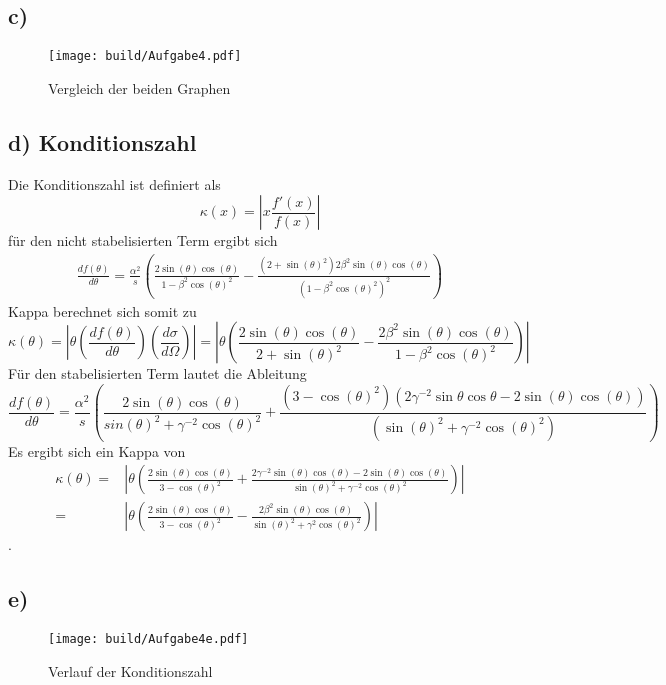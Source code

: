 \subsection*{c)}
\begin{figure}
  \centering
  \texttt{[image: build/Aufgabe4.pdf]}
  \caption{Vergleich der beiden Graphen}
  \label{fig:Vergleich der beiden Graphen}
\end{figure}
\subsection*{d) Konditionszahl}
Die Konditionszahl ist definiert als 
\begin{equation}
  \kappa(x) = \left| x\frac{f'(x)}{f(x)} \right|
  \label{}
\end{equation}
für den nicht stabelisierten Term ergibt sich 
\begin{eqnarray}
  \frac{df(\theta)}{d\theta} = \frac{\alpha^2}{s} \left( \frac{2\sin(\theta)\cos(\theta)}{1 - \beta^2 \cos(\theta)^2} - \frac{(2+\sin(\theta)^2)2\beta^2\sin(\theta)\cos(\theta)}{(1-\beta^2\cos(\theta)^2)^2} \right)
  \label{}
\end{eqnarray}
Kappa berechnet sich somit zu 
\begin{equation}
  \kappa(\theta) = \left| \theta \left( \frac{df(\theta)}{d\theta} \right) \left( \frac{d\sigma}{d\Omega} \right) \right| = \left| \theta \left( \frac{2\sin(\theta)\cos(\theta)}{2 + \sin(\theta)^2} - \frac{2\beta^2\sin(\theta)\cos(\theta)}{1 - \beta^2 \cos(\theta)^2} \right) \right|
  \label{}
\end{equation}
Für den stabelisierten Term lautet die Ableitung
\begin{equation}
  \frac{df(\theta)}{d\theta} = \frac{\alpha^2}{s}\left( \frac{2\sin(\theta)\cos(\theta)}{sin(\theta)^2+\gamma^{-2}\cos(\theta)^2} + \frac{(3-\cos(\theta)^2)(2\gamma^{-2}\sin{\theta}\cos{\theta}-2\sin(\theta)\cos(\theta))}{(\sin(\theta)^2 + \gamma^{-2}\cos(\theta)^2)} \right)
  \label{<++>}
\end{equation}
Es ergibt sich ein Kappa von 
\begin{eqnarray}
  \kappa(\theta) =& \left| \theta \left( \frac{2\sin(\theta)\cos(\theta)}{3 - \cos(\theta)^2} + \frac{2\gamma^{-2}\sin(\theta)\cos(\theta) - 2\sin(\theta)\cos(\theta)}{\sin(\theta)^2 + \gamma^{-2}\cos(\theta)^2}  \right) \right| \\
  =& \left| \theta \left( \frac{2\sin(\theta)\cos(\theta)}{3 - \cos(\theta)^2} - \frac{2\beta^2\sin(\theta)\cos(\theta)}{\sin(\theta)^2 + \gamma^2 \cos(\theta)^2} \right) \right|
\end{eqnarray}.
\subsection*{e)}
\begin{figure}
  \centering
  \texttt{[image: build/Aufgabe4e.pdf]}
  \caption{Verlauf der Konditionszahl}
  \label{fig:<+label+>}
\end{figure}
